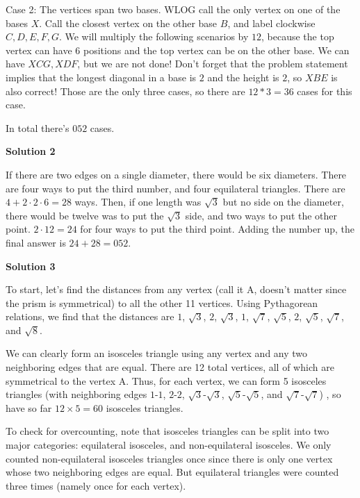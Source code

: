 \begin{enumerate}
 Case 2: The vertices span two bases. WLOG call the only vertex on one of the bases $X$. Call the closest vertex on the other base $B$, and label clockwise $C, D, E, F, G$. We will multiply the following scenarios by $12$, because the top vertex can have $6$ positions and the top vertex can be on the other base. We can have $XCG, XDF$, but we are not done! Don't forget that the problem statement implies that the longest diagonal in a base is $2$ and the height is $2$, so $XBE$ is also correct! Those are the only three cases, so there are $12*3=36$ cases for this case.

 In total there's $\boxed{052}$ cases.

 



\textbf{Solution 2}

If there are two edges on a single diameter, there would be six diameters. There are four ways to put the third number, and four equilateral triangles. There are $4+ 2 \cdot 2\cdot 6 = 28$ ways. Then, if one length was $\sqrt{3}$ but no side on the diameter, there would be twelve was to put the $\sqrt{3}$ side, and two ways to put the other point. $2 \cdot 12 = 24$ for four ways to put the third point. Adding the number up, the final answer is $24+28 = \boxed{052}.$




\textbf{Solution 3}

To start, let's find the distances from any vertex (call it A, doesn't matter since the prism is symmetrical) to all the other 11 vertices. Using Pythagorean relations, we find that the distances are $1$, $\sqrt{3}$, $2$, $\sqrt{3}$, $1$, $\sqrt{7}$, $\sqrt{5}$, $2$, $\sqrt{5}$, $\sqrt{7}$, and $\sqrt{8}$.

 We can clearly form an isosceles triangle using any vertex and any two neighboring edges that are equal. There are 12 total vertices, all of which are symmetrical to the vertex A. Thus, for each vertex, we can form 5 isosceles triangles (with neighboring edges $1$-$1$, $2$-$2$, $\sqrt{3}$-$\sqrt{3}$, $\sqrt{5}$-$\sqrt{5}$, and $\sqrt{7}$-$\sqrt{7}$) , so have so far $12 \times 5 = 60$ isosceles triangles.

 To check for overcounting, note that isosceles triangles can be split into two major categories: equilateral isosceles, and non-equilateral isosceles. We only counted non-equilateral isosceles triangles once since there is only one vertex whose two neighboring edges are equal. But equilateral triangles were counted three times (namely once for each vertex).


\end{enumerate}
